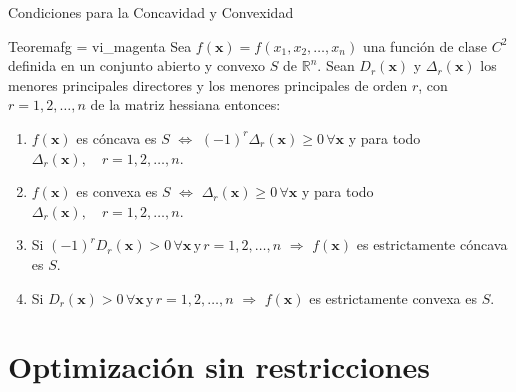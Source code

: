 \documentclass[10pt,aspectratio=169]{beamer}  %
\begin{document}
\begin{frame}{Condiciones para la Concavidad y Convexidad}

	\begin{varblock}{Teorema}{fg = vi_magenta}
		Sea $f(\mathbf{x}) = f(x_1, x_2, \dots, x_n)$ una función de clase $C^2$ definida en un conjunto abierto
		y convexo $S$ de  $\mathbb{R}^n$. Sean $D_r(\mathbf{x})$ y $\Delta_r(\mathbf{x})$ los menores principales 
		directores y los menores principales de orden $r$, con $ r = 1,2, \dots, n$ de la matriz hessiana entonces:

		\begin{enumerate}[label=(\alph*)]
			\item $f(\mathbf{x})$ es cóncava es $S$  $\Longleftrightarrow$  $(-1)^r \Delta_r(\mathbf{x}) \geq 0 \, \forall \mathbf{x}$
			y para todo $\Delta_r(\mathbf{x}), \quad  r = 1,2, \dots, n$.

			\item $f(\mathbf{x})$ es convexa es $S$  $\Longleftrightarrow$  $\Delta_r(\mathbf{x}) \geq 0 \, \forall \mathbf{x}$
			y para todo $\Delta_r(\mathbf{x}), \quad  r = 1,2, \dots, n$.
			
			\item Si $(-1)^r D_r(\mathbf{x}) > 0 \, \forall \mathbf{x} \, \text{y} \, r = 1,2, \dots, n$  $\Longrightarrow$ 
			 $f(\mathbf{x})$ es estrictamente cóncava es $S$.
			
			\item Si $D_r(\mathbf{x}) > 0 \, \forall \mathbf{x} \, \text{y} \, r = 1,2, \dots, n$  $\Longrightarrow$ 
			 $f(\mathbf{x})$ es estrictamente convexa es $S$.
		\end{enumerate}

	\end{varblock}

\end{frame}


% 
\section{Optimización sin restricciones}
\end{document}
